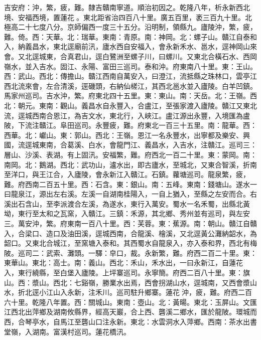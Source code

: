 \begin{pinyinscope}
吉安府：沖，繁，疲，難。隸吉贛南寧道。順治初因之。乾隆八年，析永新西北境、安福西境，置蓮花。東北距省治四百八十里。廣五百里，袤三百九十里。北極高二十七度八分。京師偏西一度三十五分。沿明制，領縣九。廬陵沖，繁，疲，難。倚。西：天華。北：瑞華。東南：青原。南：神岡。北：螺子山。贛江自泰和入，納義昌水，東北逕廟前汛，廬水西自安福入，會永新禾水、邕水，逕神岡山來會。又北逕城東，合真君山，逕白鷺洲至螺子川，曰螺川。又東北合橫石水、西岡嶺水，並入吉水。固江、永陽、富田三巡司。泰和沖。府東南八十里。東：王山。西：武山。西北：傳擔山。贛江西南自萬安入，曰澄江，流抵縣之珠林口，雲亭江西北流來會，左合清溪，逕磯頭，右納仙槎江，其西北邕水並入廬陵。白羊凹鎮。馬家州巡司。吉水沖，繁。府東北四十五里。東：東山。南：天岳。北：王嶺。西北：朝元。東南：觀山。義昌水自永豐入，合盧江，至張家渡入廬陵。贛江又東北流，逕城西南合恩江，為吉文水，東北行，入峽江。盧江源出永豐，入境匯為盧陂，下流注贛江。阜田巡司。永豐疲，難。府東北一百三十五里。南：龍華。西：西華。北：巘山。東：郭山。西北：王嶺。恩江一名永豐水，出寧都及樂安、興國，流逕城東南，合葛溪、白水，會龍門江、義昌水，入吉水，注贛江。巡司三：層山、沙溪、表湖。有上固汛。安福繁，難。府西北一百二十里。東：蒙岡。南：南岡。北：鵝湖。西北：武功山，瀘水出，即古廬水，至城北，又東合智溪，折南至洋口，與王江合，入廬陵，會永新江入贛江。石鎮。蘿塘巡司。龍泉繁，疲，難。府西南二百五十里。西：石含。東：銀山。南：五峰。東南：錢塘山。遂水一曰龍泉江，源出左右溪。左溪一自湖南桂陽入，一自上猶入，至縣之左安而合。右溪出石含山，至李派渡合左溪，為遂水，東行入萬安。蜀水一名禾蜀，出縣北黃坳，東行至太和之瓦窯，入贛江。三鎮：禾源，其北鄉、秀州並有巡司，與左安三。萬安沖，繁。府東南一百八十里。西：芙蓉。東：蕉源。南：朝山。贛江自贛入，合梁口、造口及油田溪，逕城西南，合龍溪、檜溪，又北逕黃公灘納韶水，為韶口。又東北合城江，至窯塘入泰和。其西蜀水自龍泉入，亦入泰和界，西北有梅陂。巡司二：武索、灘頭。一驛：皁口，裁。永新繁，難。府西二百二十里。東：東華山。東北：高士。南：義山。西北：禾山，禾水出，一曰永新江，自蓮花入，東行繞縣，至白堡入廬陵。上坪寨巡司。永寧簡。府西二百八十里。東：旗山。西：漿山。西北：七谿嶺，勝業水出焉，西會拐湖山水，逕城南，又西會漿山水，折北逕小江山入永新，注禾川。巡司駐升鄉寨。蓮花沖，疲，難。府西二百六十里。乾隆八年置。西：關城山。東南：壺山。北：黃暘。東北：玉屏山。文匯江西北出萍鄉及湖南攸縣界，經高天巖，合上西、礱溪二鄉水，匯於龍陂。環城而西，合琴亭水，自馬江至礱山口注永新。東北：水雲洞水入萍鄉。西南：茶水出書堂嶺，入湖南。富漢村巡司。蓮花橋汛。


\end{pinyinscope}
